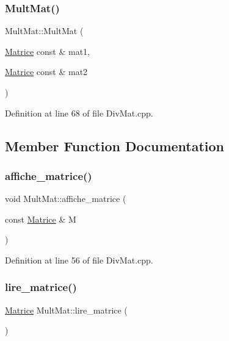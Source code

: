 \subsubsection{\texorpdfstring{Mult\+Mat()}{MultMat()}}
{\footnotesize\ttfamily Mult\+Mat\+::\+Mult\+Mat (\begin{DoxyParamCaption}\item[{\mbox{\hyperlink{_div_mat_8h_a5cd1306cd22bb9a4a8d8b6ead3f49a08}{Matrice}} const \&}]{mat1,  }\item[{\mbox{\hyperlink{_div_mat_8h_a5cd1306cd22bb9a4a8d8b6ead3f49a08}{Matrice}} const \&}]{mat2 }\end{DoxyParamCaption})}



Definition at line 68 of file Div\+Mat.\+cpp.



\subsection{Member Function Documentation}
\mbox{\label{class_mult_mat_aa504768889a47b3b0b335639baa64403}} 
\subsubsection{\texorpdfstring{affiche\+\_\+matrice()}{affiche\_matrice()}}
{\footnotesize\ttfamily void Mult\+Mat\+::affiche\+\_\+matrice (\begin{DoxyParamCaption}\item[{const \mbox{\hyperlink{_div_mat_8h_a5cd1306cd22bb9a4a8d8b6ead3f49a08}{Matrice}} \&}]{M }\end{DoxyParamCaption})}



Definition at line 56 of file Div\+Mat.\+cpp.

\mbox{\label{class_mult_mat_a9dceb9db8ae5d70a5185970b7195e24a}} 
\subsubsection{\texorpdfstring{lire\+\_\+matrice()}{lire\_matrice()}}
{\footnotesize\ttfamily \mbox{\hyperlink{_div_mat_8h_a5cd1306cd22bb9a4a8d8b6ead3f49a08}{Matrice}} Mult\+Mat\+::lire\+\_\+matrice (\begin{DoxyParamCaption}{ }\end{DoxyParamCaption})}



